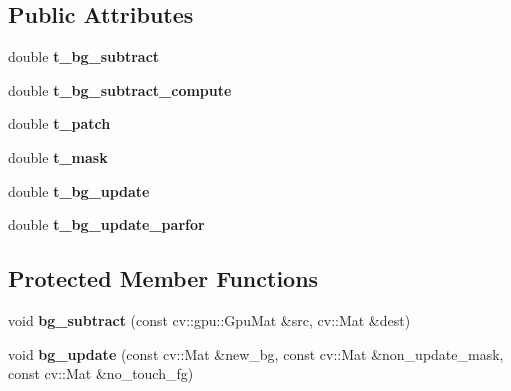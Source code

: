 \subsection*{Public Attributes}
\begin{DoxyCompactItemize}
\item 
\hypertarget{classskl_1_1gpu_1_1_table_object_manager_bi_background_a93f0c48a1761cf9e91bc0fc771007423}{}\label{classskl_1_1gpu_1_1_table_object_manager_bi_background_a93f0c48a1761cf9e91bc0fc771007423} 
double {\bfseries t\+\_\+bg\+\_\+subtract}
\item 
\hypertarget{classskl_1_1gpu_1_1_table_object_manager_bi_background_a46582d9e962e0108fb4d1752509cd6ad}{}\label{classskl_1_1gpu_1_1_table_object_manager_bi_background_a46582d9e962e0108fb4d1752509cd6ad} 
double {\bfseries t\+\_\+bg\+\_\+subtract\+\_\+compute}
\item 
\hypertarget{classskl_1_1gpu_1_1_table_object_manager_bi_background_a704ecd6b95a6a0d5b9e8892968114fbd}{}\label{classskl_1_1gpu_1_1_table_object_manager_bi_background_a704ecd6b95a6a0d5b9e8892968114fbd} 
double {\bfseries t\+\_\+patch}
\item 
\hypertarget{classskl_1_1gpu_1_1_table_object_manager_bi_background_aa0f7bc3fc4737a58d88972914c0d7864}{}\label{classskl_1_1gpu_1_1_table_object_manager_bi_background_aa0f7bc3fc4737a58d88972914c0d7864} 
double {\bfseries t\+\_\+mask}
\item 
\hypertarget{classskl_1_1gpu_1_1_table_object_manager_bi_background_a8303151dde3b9a9653d9f242eb510122}{}\label{classskl_1_1gpu_1_1_table_object_manager_bi_background_a8303151dde3b9a9653d9f242eb510122} 
double {\bfseries t\+\_\+bg\+\_\+update}
\item 
\hypertarget{classskl_1_1gpu_1_1_table_object_manager_bi_background_a4c68b7b6bde6cd9c148e2ad4a7cc9c29}{}\label{classskl_1_1gpu_1_1_table_object_manager_bi_background_a4c68b7b6bde6cd9c148e2ad4a7cc9c29} 
double {\bfseries t\+\_\+bg\+\_\+update\+\_\+parfor}
\end{DoxyCompactItemize}
\subsection*{Protected Member Functions}
\begin{DoxyCompactItemize}
\item 
\hypertarget{classskl_1_1gpu_1_1_table_object_manager_bi_background_a3c1c9ab864bfb738b4236abac621a540}{}\label{classskl_1_1gpu_1_1_table_object_manager_bi_background_a3c1c9ab864bfb738b4236abac621a540} 
void {\bfseries bg\+\_\+subtract} (const cv\+::gpu\+::\+Gpu\+Mat \&src, cv\+::\+Mat \&dest)
\item 
\hypertarget{classskl_1_1gpu_1_1_table_object_manager_bi_background_abcc41b7f4769d0c1e8f660c08c972380}{}\label{classskl_1_1gpu_1_1_table_object_manager_bi_background_abcc41b7f4769d0c1e8f660c08c972380} 
void {\bfseries bg\+\_\+update} (const cv\+::\+Mat \&new\+\_\+bg, const cv\+::\+Mat \&non\+\_\+update\+\_\+mask, const cv\+::\+Mat \&no\+\_\+touch\+\_\+fg)
\end{DoxyCompactItemize}
